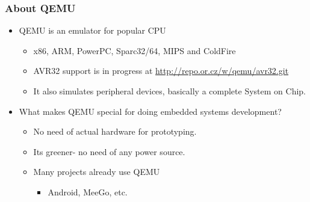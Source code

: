 \documentclass[11pt]{beamer}
\begin{document}
\begin{frame}[fragile]\frametitle{About QEMU}
\label{sec-4.1}

\begin{itemize}

\item QEMU is an emulator for popular CPU\\
\label{sec-4.1.1}

\begin{itemize}

\item x86, ARM, PowerPC, Sparc32/64, MIPS and ColdFire\\
\label{sec-4.1.1.1}


\item AVR32 support is in progress at \href{http://repo.or.cz/w/qemu/avr32.git}{http://repo.or.cz/w/qemu/avr32.git}\\
\label{sec-4.1.1.2}


\item It also simulates peripheral devices, basically a complete System on Chip.\\
\label{sec-4.1.1.3}

\end{itemize} %

\item What makes QEMU special for doing embedded systems development?\\
\label{sec-4.1.2}

\begin{itemize}

\item No need of actual hardware for prototyping.\\
\label{sec-4.1.2.1}


\item Its greener- no need of any power source.\\
\label{sec-4.1.2.2}


\item Many projects already use QEMU\\
\label{sec-4.1.2.3}

\begin{itemize}
\item Android, MeeGo, etc.
\end{itemize}
\end{itemize} %
\end{itemize} %
\end{frame}
\end{document}
